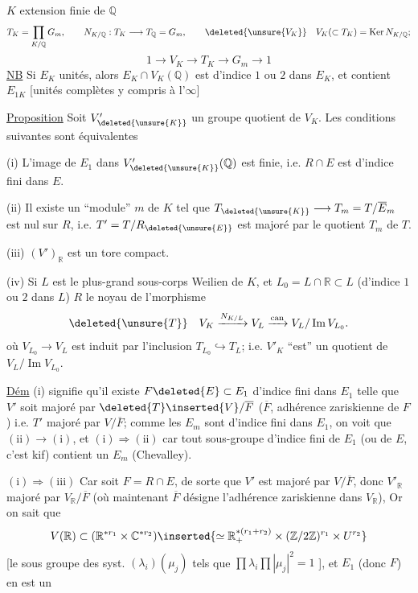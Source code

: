 $K$ extension finie de $\mathbb Q$
\[
T_K=\prod_{K/\mathbb Q}G_m,\qquad
N_{K/\mathbb Q}:T_K\longrightarrow T_{\mathbb Q}=G_m,\qquad
\deleted{\unsure{V_K}}\quad V_K(\subset T_K)=\operatorname{Ker}N_{K/\mathbb Q};
\]
\[
1\longrightarrow V_K\longrightarrow T_K\longrightarrow G_m\longrightarrow1
\]
\uline{NB} Si $E_K$ unités, alors $E_K\cap V_K(\mathbb Q)$ est d'indice $1$ ou $2$
dans $E_K$, et contient $E_{1K}$ [unités complètes y compris à l'$\infty$]

\uline{Proposition} Soit $V'_{\deleted{\unsure{K}}}$  un groupe quotient de $V_K$.
Les conditions suivantes sont équivalentes

(i) L'image de $E_1$ dans $V'_{\deleted{\unsure{K}}}(\mathbb Q)$ est finie, i.e.
$R\cap E$ est d'indice fini dans $E$.

(ii) Il existe un ``module'' $m$ de $K$ tel que
$T_{\deleted{\unsure{K}}}\longrightarrow T_m=T/\overline E_m$
est nul sur $R$, i.e. $T'=T/R_{\deleted{\unsure{E}}}$ est majoré par le quotient $T_m$ de $T$.

(iii) $(V')_{\mathbb R}$ est un tore compact.

(iv) Si $L$  est le plus-grand sous-corps Weilien de $K$, et
$L_0=L\cap\mathbb R\subset L$ (d'indice $1$ ou $2$ dans $L$)
$R$   le noyau de l'morphisme
\[
\deleted{\unsure{T}}\quad
V_K\xrightarrow{N_{K/L}}V_L\xrightarrow{\mathrm{can}}V_L/\operatorname{Im}V_{L_0}.
\]
où $V_{L_0}\longrightarrow V_L$ est induit par l'inclusion
$T_{L_0}\hookrightarrow T_L$; i.e.
$V'_K$ ``est'' un quotient de $V_L/\operatorname{Im}V_{L_0}$.

\uline{Dém} (i) signifie qu'il existe $F\deleted{E}\subset E_1$
 d'indice fini dans $E_1$ telle que $V'$ soit majoré par
$\deleted{T}\inserted{V}/\overline F$ ($\overline F$, adhérence zariskienne de $F$)
i.e. $T'$ majoré par $V/\overline F$; comme les $E_m$ sont d'indice fini
dans $E_1$, on voit que $(\mathrm{ii})\longrightarrow(\mathrm{i})$, et
$(\mathrm{i})\Rightarrow(\mathrm{ii})$ car tout sous-groupe d'indice fini de $E_1$
 (ou de $E$, c'est kif) contient un $E_m$ (Chevalley).

$(\mathrm{i})\Longrightarrow(\mathrm{iii})$ Car soit 
$F=R\cap E$, de sorte que $V'$ est majoré par $V/\overline F$,
 donc $V'_{\mathbb R}$ majoré par $V_{\mathbb R}/\overline F$
(où maintenant $\overline F$ désigne l'adhérence zariskienne dans $V_{\mathbb R}$),
Or on sait que
\[
V(\mathbb R)\subset
(\mathbb R^{*r_1}\times\mathbb C^{*r_2})
\inserted{\simeq\mathbb R_+^{*(r_1+r_2)}\times(\mathbb Z/2\mathbb Z)^{r_1}\times U^{r_2}}
\]
[le  sous groupe des syst. $(\lambda_i)(\mu_j)$
tels que $\prod\lambda_i\prod|\mu_j|^2=1$
],
et $E_1$ (donc $F$) en est un


